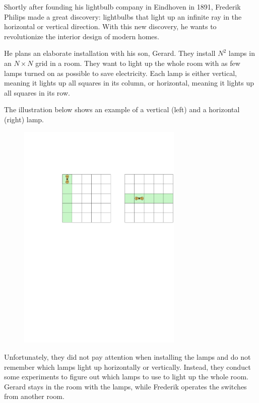 
Shortly after founding his lightbulb company in Eindhoven in 1891, Frederik Philips made a great discovery: lightbulbs
that light up an infinite ray in the horizontal or vertical direction. With this new discovery, he
wants to revolutionize the interior design of modern homes.

He plans an elaborate installation with his son, Gerard. They install $N^2$ lamps in an $N \times N$
grid in a room.
They want to light up the whole room with as few lamps turned on as possible to save electricity.
Each lamp is either vertical, meaning it lights up all squares in its column, or horizontal, meaning it lights up all squares in its row.

The illustration below shows an example of a vertical (left) and a horizontal (right) lamp.

\begin{figure}
\centering
\includegraphics[width=0.7\textwidth]{vert_horiz.pdf}
\end{figure}

Unfortunately, they did not pay attention when installing
the lamps and do not remember which lamps light up horizontally or vertically.
Instead, they conduct some experiments to figure out which lamps to use to light up the whole room.
Gerard stays in the room with the lamps, while Frederik operates the switches from another room.

